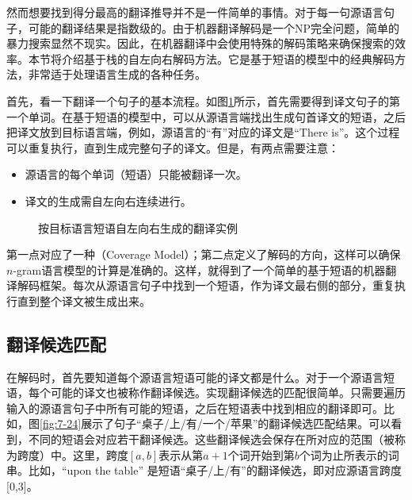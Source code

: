 \parinterval 然而想要找到得分最高的翻译推导并不是一件简单的事情。对于每一句源语言句子，可能的翻译结果是指数级的。由于机器翻译解码是一个NP完全问题，简单的暴力搜索显然不现实。因此，在机器翻译中会使用特殊的解码策略来确保搜索的效率。本节将介绍基于栈的自左向右解码方法。它是基于短语的模型中的经典解码方法，非常适于处理语言生成的各种任务。

\parinterval 首先，看一下翻译一个句子的基本流程。如图\ref{fig:7-23}所示，首先需要得到译文句子的第一个单词。在基于短语的模型中，可以从源语言端找出生成句首译文的短语，之后把译文放到目标语言端，例如，源语言的“有”对应的译文是“There is”。这个过程可以重复执行，直到生成完整句子的译文。但是，有两点需要注意：

\begin{itemize}
\vspace{0.5em}
\item 源语言的每个单词（短语）只能被翻译一次。
\vspace{0.5em}
\item 译文的生成需自左向右连续进行。
\vspace{0.5em}
\end{itemize}

\begin{figure}[htp]
\centering

\caption{按目标语言短语自左向右生成的翻译实例}
\label{fig:7-23}
\end{figure}

\parinterval 第一点对应了一种{\small{}}（Coverage Model）；第二点定义了解码的方向，这样可以确保$n$-gram语言模型的计算是准确的。这样，就得到了一个简单的基于短语的机器翻译解码框架。每次从源语言句子中找到一个短语，作为译文最右侧的部分，重复执行直到整个译文被生成出来。


\subsection{翻译候选匹配}

\parinterval 在解码时，首先要知道每个源语言短语可能的译文都是什么。对于一个源语言短语，每个可能的译文也被称作翻译候选。实现翻译候选的匹配很简单。只需要遍历输入的源语言句子中所有可能的短语，之后在短语表中找到相应的翻译即可。比如，图\ref{fig:7-24}展示了句子“桌子/上/有/一个/苹果”的翻译候选匹配结果。可以看到，不同的短语会对应若干翻译候选。这些翻译候选会保存在所对应的范围（被称为跨度）中。这里，跨度$[a,b]$表示从第$a+1$个词开始到第$b$个词为止所表示的词串。比如，“upon the table” 是短语“桌子/上/有”的翻译候选，即对应源语言跨度[0,3]。

